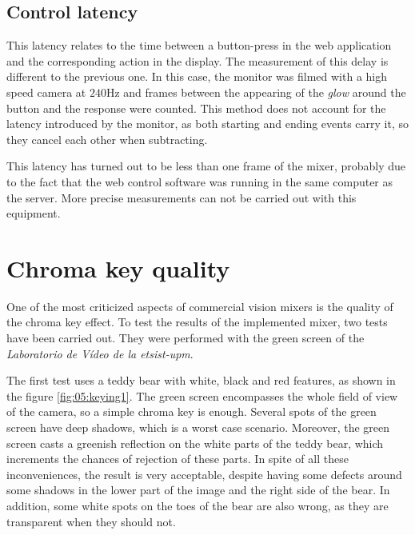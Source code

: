 \documentclass[../main.tex]{subfiles}
\begin{document}
\subsection{Control latency}
This latency relates to the time between a button-press in the web application and the corresponding action in the display. The measurement of this delay is different to the previous one. In this case, the monitor was filmed with a high speed camera at $240 \si{\hertz}$ and frames between the appearing of the \textit{glow} around the button and the response were counted. This method does not account for the latency introduced by the monitor, as both starting and ending events carry it, so they cancel each other when subtracting.\newline

This latency has turned out to be less than one frame of the mixer, probably due to the fact that the web control software was running in the same computer as the server. More precise measurements can not be carried out with this equipment.\newline





\section{Chroma key quality}
One of the most criticized aspects of commercial vision mixers is the quality of the chroma key effect. To test the results of the implemented mixer, two tests have been carried out. They were performed with the green screen of the \textit{Laboratorio de Vídeo de la \gls{etsist}-\gls{upm}}.\newline

The first test uses a teddy bear with white, black and red features, as shown in the figure \ref{fig:05:keying1}. The green screen encompasses the whole field of view of the camera, so a simple chroma key is enough. Several spots of the green screen have deep shadows, which is a worst case scenario. Moreover, the green screen casts a greenish reflection on the white parts of the teddy bear, which increments the chances of rejection of these parts. In spite of all these inconveniences, the result is very acceptable, despite having some defects around some shadows in the lower part of the image and the right side of the bear. In addition, some white spots on the toes of the bear are also wrong, as they are transparent when they should not.\newline
\end{document}
